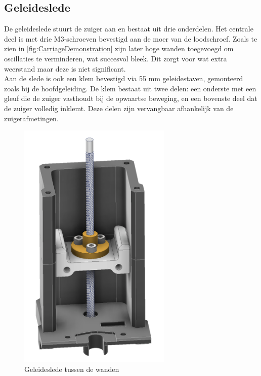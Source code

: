 \subsection{Geleideslede}
De geleideslede stuurt de zuiger aan en bestaat uit drie onderdelen. Het centrale deel is met drie M3-schroeven bevestigd aan de moer van de loodschroef. Zoals te zien in \autoref{fig:CarriageDemonstration} zijn later hoge wanden toegevoegd om oscillaties te verminderen, wat succesvol bleek. Dit zorgt voor wat extra weerstand maar deze is niet significant.
\\[12pt]Aan de slede is ook een klem bevestigd via 55 mm geleidestaven, gemonteerd zoals bij de hoofdgeleiding. De klem bestaat uit twee delen: een onderste met een gleuf die de zuiger vasthoudt bij de opwaartse beweging, en een bovenste deel dat de zuiger volledig inklemt. Deze delen zijn vervangbaar afhankelijk van de zuigerafmetingen.
\\[12pt]\begin{minipage}[t]{0.39\textwidth}
    \vspace{0pt}
    \begin{figure}[H]
        \centering
        \captionsetup{width=1\textwidth} %
        \includegraphics[width=0.65\textwidth]{figures/CarriageDemonstration.png}
        \caption{Geleideslede tussen de wanden}\label{fig:CarriageDemonstration}
    \end{figure}
\end{minipage}
